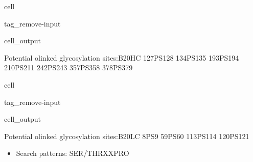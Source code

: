 \documentclass[letterpaper,10pt,english]{jupyterBook}
\begin{document}
\begin{sphinxuseclass}{cell}
\begin{sphinxuseclass}{tag_remove-input}\begin{sphinxVerbatimOutput}

\begin{sphinxuseclass}{cell_output}
\begin{sphinxVerbatim}[commandchars=\\\{\}]
Potential o\PYGZhy{}linked glycosylation sites:\PYGZhy{}\PYGZhy{}\PYGZhy{}\PYGZhy{}\PYGZhy{}\PYGZhy{}\PYGZhy{}\PYGZhy{}\PYGZhy{}\PYGZhy{}\PYGZhy{}\PYGZhy{}\PYGZhy{}\PYGZhy{}B20\PYGZus{}HC
127\PYGZhy{}PS\PYGZhy{}128
134\PYGZhy{}PS\PYGZhy{}135
193\PYGZhy{}PS\PYGZhy{}194
210\PYGZhy{}PS\PYGZhy{}211
242\PYGZhy{}PS\PYGZhy{}243
357\PYGZhy{}PS\PYGZhy{}358
378\PYGZhy{}PS\PYGZhy{}379
\end{sphinxVerbatim}

\end{sphinxuseclass}\end{sphinxVerbatimOutput}

\end{sphinxuseclass}
\end{sphinxuseclass}
\begin{sphinxuseclass}{cell}
\begin{sphinxuseclass}{tag_remove-input}\begin{sphinxVerbatimOutput}

\begin{sphinxuseclass}{cell_output}
\begin{sphinxVerbatim}[commandchars=\\\{\}]
Potential o\PYGZhy{}linked glycosylation sites:\PYGZhy{}\PYGZhy{}\PYGZhy{}\PYGZhy{}\PYGZhy{}\PYGZhy{}\PYGZhy{}\PYGZhy{}\PYGZhy{}\PYGZhy{}\PYGZhy{}\PYGZhy{}\PYGZhy{}\PYGZhy{}B20\PYGZus{}LC
8\PYGZhy{}PS\PYGZhy{}9
59\PYGZhy{}PS\PYGZhy{}60
113\PYGZhy{}PS\PYGZhy{}114
120\PYGZhy{}PS\PYGZhy{}121
\end{sphinxVerbatim}

\end{sphinxuseclass}\end{sphinxVerbatimOutput}

\end{sphinxuseclass}
\end{sphinxuseclass}\begin{itemize}
\item {} 
\sphinxAtStartPar
Search patterns: SER/THR\sphinxhyphen{}X\sphinxhyphen{}X\sphinxhyphen{}PRO

\end{itemize}
\end{document}
